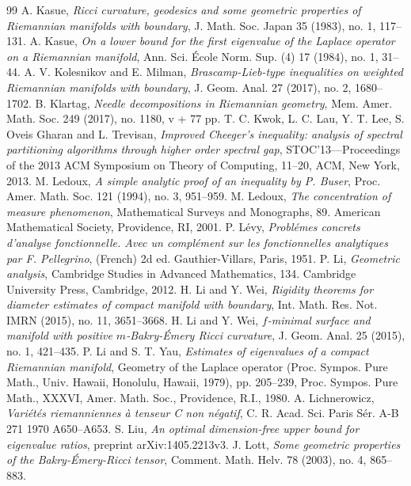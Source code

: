 \documentclass[12pt]{amsart}
\theoremstyle{plain}
\theoremstyle{definition}
\theoremstyle{remark}
\begin{document}
\begin{thebibliography}{99}
  A. Kasue, \textit{Ricci curvature, geodesics and some geometric properties of Riemannian manifolds with boundary}, J. Math. Soc. Japan 35 (1983), no. 1, 117--131.
  A. Kasue, \textit{On a lower bound for the first eigenvalue of the Laplace operator on a Riemannian manifold}, Ann. Sci. \'Ecole Norm. Sup. (4) 17 (1984), no. 1, 31--44.
  A. V. Kolesnikov and E. Milman, \textit{Brascamp-Lieb-type inequalities on weighted Riemannian manifolds with boundary}, J. Geom. Anal. 27 (2017), no. 2, 1680--1702.
  B. Klartag, \textit{Needle decompositions in Riemannian geometry}, Mem. Amer. Math. Soc. 249 (2017), no. 1180, v + 77 pp.
  T. C. Kwok, L. C. Lau, Y. T. Lee, S. Oveis Gharan and L. Trevisan, \textit{Improved Cheeger's inequality: analysis of spectral partitioning algorithms through higher order spectral gap}, STOC'13---Proceedings of the 2013 ACM Symposium on Theory of Computing, 11--20, ACM, New York, 2013.
    M. Ledoux, \textit{A simple analytic proof of an inequality by P. Buser}, Proc. Amer. Math. Soc. 121 (1994), no. 3, 951--959.
    M. Ledoux, \textit{The concentration of measure phenomenon}, Mathematical Surveys and Monographs, 89. American Mathematical Society, Providence, RI, 2001.
   P. L\'evy, \textit{Probl\'emes concrets d'analyse fonctionnelle. Avec un compl\'ement sur les fonctionnelles analytiques par F. Pellegrino}, (French) 2d ed. Gauthier-Villars, Paris, 1951.
    P. Li, \textit{Geometric analysis}, Cambridge Studies in Advanced Mathematics, 134. Cambridge University Press, Cambridge, 2012.
 H. Li and Y. Wei, \textit{Rigidity theorems for diameter estimates of compact manifold with boundary},  Int. Math. Res. Not. IMRN (2015), no. 11, 3651--3668.
 H. Li and Y. Wei, \textit{$f$-minimal surface and manifold with positive $m$-Bakry-\'Emery Ricci curvature}, J. Geom. Anal. 25 (2015), no. 1, 421--435.
    P. Li and S. T. Yau, \textit{Estimates of eigenvalues of a compact Riemannian manifold}, Geometry of the Laplace operator (Proc. Sympos. Pure Math., Univ. Hawaii, Honolulu, Hawaii, 1979), pp. 205--239, Proc. Sympos. Pure Math., XXXVI, Amer. Math. Soc., Providence, R.I., 1980.
     A. Lichnerowicz, \textit{Vari\'et\'es riemanniennes \`a tenseur C non n\'egatif}, C. R. Acad. Sci. Paris S\'er. A-B 271 1970 A650--A653.
    S. Liu, \textit{An optimal dimension-free upper bound for eigenvalue ratios}, preprint arXiv:1405.2213v3.
  J. Lott, \textit{Some geometric properties of the Bakry-\'Emery-Ricci tensor}, Comment. Math. Helv. 78 (2003), no. 4, 865--883.

\end{thebibliography}
\end{document}
